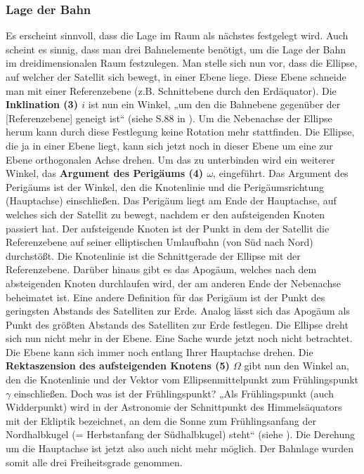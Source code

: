 \subsubsection{Lage der Bahn}
Es erscheint sinnvoll, dass die Lage im Raum als nächstes festgelegt wird. Auch scheint es sinnig, dass man drei Bahnelemente benötigt, um die Lage der Bahn im dreidimensionalen Raum festzulegen. 
\newpar
Man stelle sich nun vor, dass die Ellipse, auf welcher der Satellit sich bewegt, in einer Ebene liege.  Diese Ebene schneide man mit einer Referenzebene (z.B. Schnittebene durch den Erdäquator). Die \textbf{Inklination (3) \ensuremath{i}} ist nun ein Winkel, „um den die Bahnebene gegenüber der [Referenzebene] geneigt ist“ (siehe S.88 in \cite{HandRaum}). Um die Nebenachse der Ellipse herum kann durch diese Festlegung keine Rotation mehr stattfinden. Die Ellipse, die ja in einer Ebene liegt, kann sich jetzt noch in dieser Ebene um eine zur Ebene orthogonalen Achse drehen. Um das zu unterbinden wird ein weiterer Winkel, das \textbf{Argument des Perigäums (4) \ensuremath{\omega}}, eingeführt. Das Argument des Perigäums ist der Winkel, den die Knotenlinie und die Perigäumsrichtung (Hauptachse) einschließen. Das Perigäum liegt am Ende der Hauptachse, auf welches sich der Satellit zu bewegt, nachdem er den aufsteigenden Knoten passiert hat. Der aufsteigende Knoten ist der Punkt in dem der Satellit die Referenzebene auf seiner elliptischen Umlaufbahn (von Süd nach Nord) durchstößt. Die Knotenlinie ist die Schnittgerade der Ellipse mit der Referenzebene. Darüber hinaus gibt es das Apogäum, welches nach dem absteigenden Knoten durchlaufen wird, der am anderen Ende der Nebenachse beheimatet ist. Eine andere Definition für das Perigäum ist der Punkt des geringsten Abstands des Satelliten zur Erde. Analog lässt sich das Apogäum als Punkt des größten Abstands des Satelliten zur Erde festlegen. 
\newpar
Die Ellipse dreht sich nun nicht mehr in der Ebene. Eine Sache wurde jetzt noch nicht betrachtet. Die Ebene kann sich immer noch entlang Ihrer Hauptachse drehen. Die \textbf{Rektaszension des aufsteigenden Knotens (5) \ensuremath{\Omega}} gibt nun den Winkel an, den die Knotenlinie und der Vektor vom Ellipsenmittelpunkt zum Frühlingspunkt \ensuremath{\gamma} einschließen. Doch was ist der Frühlingspunkt? „Als Frühlingspunkt (auch Widderpunkt) wird in der Astronomie der Schnittpunkt des Himmelsäquators mit der Ekliptik bezeichnet, an dem die Sonne zum Frühlingsanfang der Nordhalbkugel (= Herbstanfang der Südhalbkugel) steht“ (siehe \cite{Wiki:Frue}). Die Derehung um die Hauptachse ist jetzt also auch nicht mehr möglich. Der Bahnlage wurden somit alle drei Freiheitsgrade genommen.     
